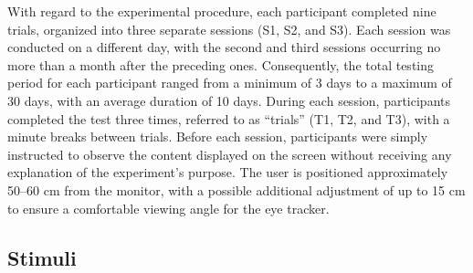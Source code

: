 \documentclass{article}
\begin{document}
With regard to the experimental procedure, each participant completed nine trials, organized into three separate sessions (S1, S2, and S3).
Each session was conducted on a different day, with the second and third sessions occurring no more than a month after the preceding ones. 
Consequently, the total testing period for each participant ranged from a minimum of 3 days to a maximum of 30 days, with an average duration of 10 days.
During each session, participants completed the test three times, referred to as “trials” (T1, T2, and T3), with a minute breaks between trials. 
Before each session, participants were simply instructed to observe the content displayed on the screen without receiving any explanation of the experiment's purpose.
The user is positioned approximately 50–60 cm from the monitor, with a possible additional adjustment of up to 15 cm to ensure a comfortable viewing angle for the eye tracker.

\subsection{Stimuli}
\end{document}
